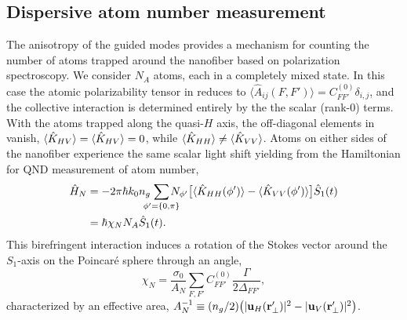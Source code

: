 \documentclass[aps,pra,twocolumn]{revtex4-1} %
\newcommand{\polcomp}{\hat{K}} %
\newcommand{\chiN}{\chi_{N}}
\newcommand{\Abir}{A_N}
\begin{document}
	\subsection{Dispersive atom number measurement} \label{Sec::AtomNumberMeasurement}

The anisotropy of the guided modes provides a mechanism for counting the number of atoms trapped around the nanofiber based on polarization spectroscopy.  
We consider $N_A$ atoms, each in a completely mixed state. In this case the atomic polarizability tensor in  reduces to $\langle \hat{A}_{ij}(F,F') \rangle = C_{FF'}^{(0)} \delta_{i,j}$, and the collective interaction is determined entirely by the the scalar (rank-0) terms.  
With the atoms trapped along the quasi-$H$ axis, the off-diagonal elements in  vanish, $\expt{ \polcomp_{HV} } = \expt{ \polcomp_{HV} } =0$, while $\expt{ \polcomp_{HH} } \neq  \expt{ \polcomp_{VV} }$.  
Atoms on either sides of the nanofiber experience the same scalar light shift yielding from   the Hamiltonian for QND measurement of atom number,
	\begin{align}
		\hat{H}_{N} &= -2\pi \hbar k_0 n_g \!\!\!\!\!\sum_{\phi' = \{0,\pi \}}\!\!\!\!\!\! N_{\phi'} \big[ \expt{ \polcomp_{HH}(\phi')}  - \expt{ \polcomp_{VV}(\phi')} \big] \hat{S}_1(t)  \nonumber \\
		& =  \hbar \chiN N_A \hat{S}_1(t).  \label{Eq::MixedHamiltonian}
	\end{align}	
This birefringent interaction induces a rotation of the Stokes vector  around the $S_1$-axis on the Poincar\'{e} sphere through an angle, 
	\begin{equation} \label{Eq::RotationAngle}
		\chiN = \frac{\sigma_0}{\Abir}  \sum_{F,F'}  C_{FF'}^{(0)} \frac{\Gamma}{2 \Delta_{FF'}},
	\end{equation}
characterized by an effective area, $\Abir^{-1} \equiv (n_g/2) \big( |\mathbf{u}_{H}(\br'_\perp)|^2 - |\mathbf{u}_{V}(\br'_\perp)| ^2 \big)$.   
\end{document}
